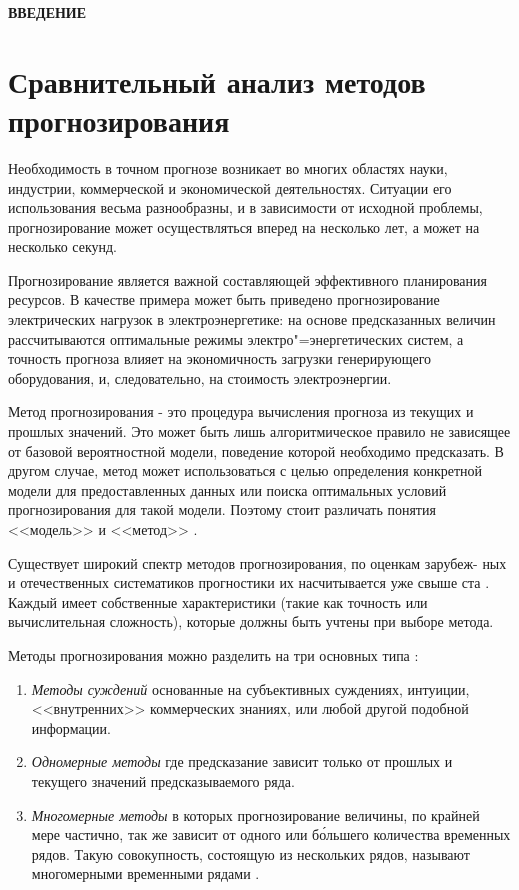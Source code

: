 \documentclass[a4paper,14pt,russian]{extreport}
\newcommand{\empline}{\vspace{1em}}
\newcommand{\likechapterheading}[1]{ 
		\clearpage   
		\begin{center}
		\textbf{\MakeUppercase{#1}}
		\end{center}
	}
\newcommand{\likechapter}[1]{ 
		\likechapterheading{#1}    
		\addtocontents{toc}{\vspace{1em}}
		\addcontentsline{toc}{likechapter}{\MakeUppercase{#1}}
		\empline
	}
\begin{document}
\tableofcontents

\likechapter{Введение}

\clearpage

\chapter{Сравнительный анализ методов прогнозирования}
Необходимость в точном прогнозе возникает во многих областях науки, 
индустрии, коммерческой и экономической деятельностях. Ситуации его 
использования весьма разнообразны, и в зависимости от исходной проблемы, 
прогнозирование может осуществляться вперед на несколько лет, а может на 
несколько секунд. 

Прогнозирование является важной составляющей эффективного планирования 
ресурсов. В качестве примера может быть приведено прогнозирование 
электрических нагрузок в электроэнергетике: на основе предсказанных величин 
рассчитываются оптимальные режимы электро"=энергетических систем, а 
точность прогноза влияет на экономичность загрузки генерирующего 
оборудования, и, следовательно, на стоимость электроэнергии.

Метод прогнозирования - это процедура вычисления прогноза из текущих и 
прошлых значений. Это может быть лишь алгоритмическое правило не 
зависящее от базовой вероятностной модели, поведение которой необходимо 
предсказать. В другом случае, метод может использоваться с целью 
определения конкретной модели для предоставленных данных или поиска 
оптимальных условий прогнозирования для такой модели. Поэтому стоит 
различать понятия <<модель>> и <<метод>> \cite{chatfield2000}. 

Существует широкий спектр методов прогнозирования, по оценкам зарубеж-
ных и отечественных систематиков прогностики их насчитывается
уже свыше ста \cite{tihonov2006}. Каждый имеет собственные характеристики 
(такие как точность или вычислительная сложность), которые должны быть 
учтены при выборе метода.

Методы прогнозирования можно разделить на три основных типа 
\cite{chatfield2000, armstrong1999, brockwell2002, hyndman2012}:
\begin{enumerate}
	\item {\itshape Методы суждений} основанные на субъективных суждениях, 
		интуиции, <<внутренних>> коммерческих знаниях, или любой другой 
		подобной информации.
	\item {\itshape Одномерные методы} где предсказание зависит только от 
		прошлых и текущего значений предсказываемого ряда.
	\item {\itshape Многомерные методы} в которых прогнозирование величины, 
		по крайней мере частично, так же зависит от одного или б\'{о}льшего 
		количества временных рядов. Такую совокупность, состоящую из 
		нескольких рядов, называют многомерными временными рядами 
		\cite{popov2006}.
\end{enumerate}
\end{document}
